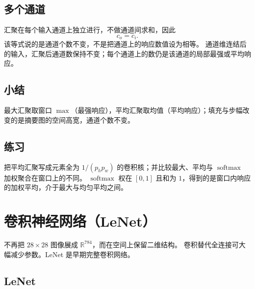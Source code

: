 \subsection{多个通道}

汇聚在每个输入通道上独立进行，不做通道间求和，因此
\[
c_o=c_i.
\]
该等式说的是通道个数不变，不是把通道上的响应数值设为相等。
通道维连结后的输入，汇聚后通道数保持不变；每个通道上的数仍是该通道的局部最强或平均响应。

\subsection{小结}

最大汇聚取窗口 $\max$（最强响应），平均汇聚取均值（平均响应）；填充与步幅改变的是摘要图的空间高宽，通道个数不变。

\subsection{练习}

把平均汇聚写成元素全为 $1/(p_h p_w)$ 的卷积核；并比较最大、平均与 $\operatorname{softmax}$ 加权聚合在窗口上的不同。
$\operatorname{softmax}$ 权在 $[0,1]$ 且和为 $1$，得到的是窗口内响应的加权平均，介于最大与均匀平均之间。

\section{卷积神经网络（LeNet）}




不再把 $28\times 28$ 图像展成 $\mathbb{R}^{784}$，而在空间上保留二维结构。
卷积替代全连接可大幅减少参数。LeNet 是早期完整卷积网络。

\subsection{LeNet}

